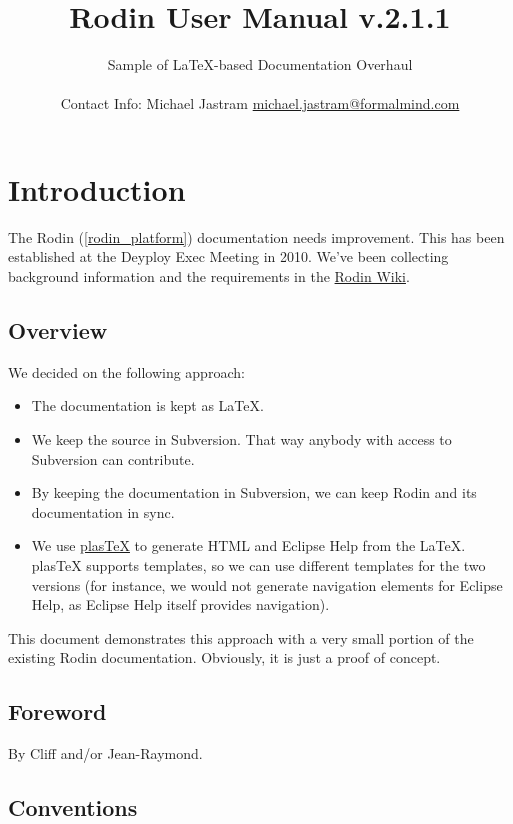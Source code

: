 \documentclass{book}
\title{Rodin User Manual v.2.1.1}
\author{Sample of \LaTeX-based Documentation Overhaul\\ \\
Contact Info: Michael Jastram \href{mailto:michael.jastram@formalmind.com}{michael.jastram@formalmind.com}}
\begin{document}
        

\maketitle

\chapter{Introduction}

The Rodin (\ref{rodin_platform}) documentation needs improvement.  This has been established at the Deyploy Exec Meeting in 2010.  We've been collecting background information and the requirements in the \href{http://wiki.event-b.org/index.php/User_Documentation_Overhaul}{Rodin Wiki}.

\section{Overview}

We decided on the following approach:

\begin{itemize}
\item The documentation is kept as \LaTeX.
\item We keep the source in Subversion.  That way anybody with access to Subversion can contribute.
\item By keeping the documentation in Subversion, we can keep Rodin and its documentation in sync.
\item We use \href{http://plastex.sourceforge.net/}{plasTeX} to generate HTML and Eclipse Help from the \LaTeX.  plasTeX supports templates, so we can use different templates for the two versions (for instance, we would not generate navigation elements for Eclipse Help, as Eclipse Help itself provides navigation).
\end{itemize}

This document demonstrates this approach with a very small portion of the existing Rodin documentation.  Obviously, it is just a proof of concept.

\section{Foreword}

By Cliff and/or Jean-Raymond.

\section{Conventions}
\label{conventions}
\end{document}
